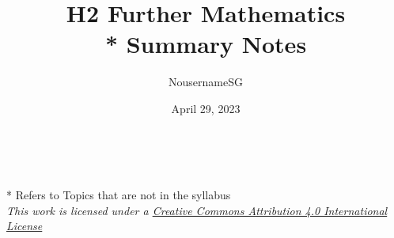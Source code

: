 
\title{H2 Further Mathematics \\* Summary Notes}
\author{NousernameSG}
\date{April 29, 2023}



\maketitle

\newpage \ \newpage

{\onecolumn \setcounter{tocdepth}{2} \tableofcontents}
\vfill \noindent
* Refers to Topics that are not in the syllabus \\
\textit{This work is licensed under a \href{http://creativecommons.org/licenses/by/4.0/}{Creative Commons Attribution 4.0 International License}}
\newpage
\twocolumn

 \newpage
 \newpage
 \newpage
 \newpage
 \newpage
 \newpage
 \newpage
 \newpage



